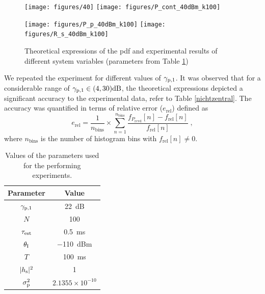 \begin{figure}
	\centering
	\texttt{[image: figures/40]}%
	\texttt{[image: figures/P\_cont\_40dBm\_k100]}%
	
	\texttt{[image: figures/P\_p\_40dBm\_k100]}%
	\texttt{[image: figures/R\_s\_40dBm\_k100]}%
	\caption{Theoretical expressions of the pdf and experimental results of different system variables (parameters from Table \ref{param})}
	\label{hrel_pdf}
\end{figure}

We repeated the experiment for different values of ${\gamma}_{\text{p,1}}$. It was observed that for a considerable range of ${\gamma}_{\text{p,1}} \in (4,30)\SI{}{dB}$, the theoretical expressions depicted a significant accuracy to the experimental data, refer to Table \ref{nichtzentral}. The accuracy was quantified in terms of relative error ($e_\textrm{rel}$) defined as
\begin{equation}
\label{fr}
e_\textrm{rel} = \frac{1}{n_\textrm{bins}} \times \sum_{n=1}^{n_\textrm{bins}} \frac{f_{P_\textrm{rcvd}}[n] - f_\textrm{rel}[n]}{f_\textrm{rel}[n]} \;  , 
\end{equation}
where $n_\textrm{bins}$ is the number of histogram bins with $f_\textrm{rel}[n] \neq 0$.

\begin{table}
	\renewcommand{\arraystretch}{1.4}
	\centering
	\caption{Values of the parameters used for the performing experiments.}
	\label{param}
	\begin{tabular}{c||c}
		\bfseries Parameter & \bfseries Value \\ \hline \hline
		${\gamma}_{\text{p,1}}$ & \SI{22}{dB} \\
		$N$ & 100 \\
		$\tau_{\text{est}}$ & \SI{0.5}{ms}\\
		$\theta_{\text{I}}$ & \SI{-110}{dBm}\\
		$T$ & \SI{100}{ms}\\
		$|h_{\text{s}}|^2$ & 1 \\
		$\sigma^2_{\text{p}}$ & $2.1355\times10^{-10}$\\ \hline
	\end{tabular}
\end{table}

